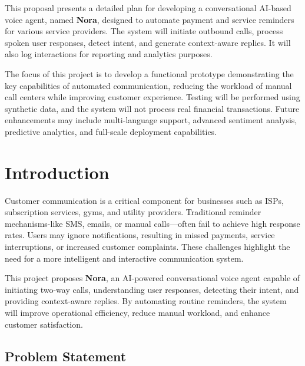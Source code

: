 \documentclass[12pt,a4paper]{report}
\begin{document}
This proposal presents a detailed plan for developing a conversational AI-based voice agent, named \textbf{Nora}, designed to automate payment and service reminders for various service providers. The system will initiate outbound calls, process spoken user responses, detect intent, and generate context-aware replies. It will also log interactions for reporting and analytics purposes.

The focus of this project is to develop a functional prototype demonstrating the key capabilities of automated communication, reducing the workload of manual call centers while improving customer experience. Testing will be performed using synthetic data, and the system will not process real financial transactions. Future enhancements may include multi-language support, advanced sentiment analysis, predictive analytics, and full-scale deployment capabilities.

\newpage
\tableofcontents
\newpage


\listoffigures
{}

\listoftables
{}

\newpage


\chapter{Introduction}

Customer communication is a critical component for businesses such as ISPs, subscription services, gyms, and utility providers. Traditional reminder mechanisms-like SMS, emails, or manual calls—often fail to achieve high response rates. Users may ignore notifications, resulting in missed payments, service interruptions, or increased customer complaints. These challenges highlight the need for a more intelligent and interactive communication system.

This project proposes \textbf{Nora}, an AI-powered conversational voice agent capable of initiating two-way calls, understanding user responses, detecting their intent, and providing context-aware replies. By automating routine reminders, the system will improve operational efficiency, reduce manual workload, and enhance customer satisfaction.

\section{Problem Statement}
\end{document}
